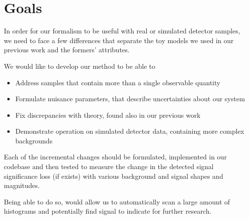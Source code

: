 \documentclass[thesis/Elad_Kliger_Thesis.tex]{subfiles}
\begin{document}
\section{Goals}

In order for our formalism to be useful with real or simulated detector samples, we need to face a few differences that separate the toy models we used in our previous work and the formers' attributes.

We would like to develop our method to be able to
\begin{itemize}
    \item Address samples that contain more than a single observable quantity
    \item Formulate nuisance parameters, that describe uncertainties about our system
    \item Fix discrepancies with theory, found also in our previous work
    \item Demonstrate operation on simulated detector data, containing more complex backgrounds
\end{itemize}

Each of the incremental changes should be formulated, implemented in our codebase and then tested to measure the change in the detected signal significance loss (if exists) with various background and signal shapes and magnitudes.

Being able to do so, would allow us to automatically scan a large amount of histograms and potentially find signal to indicate for further research.
\end{document}
